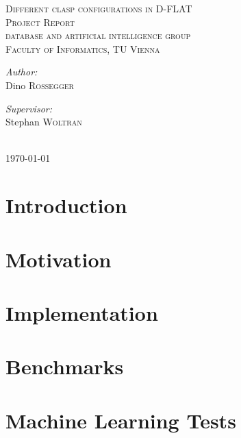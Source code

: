 

\begin{titlepage}
\center
\textsc{\LARGE{Different clasp configurations in D-FLAT}}\\[1.5cm]
\textsc{\large{Project Report}}\\[1cm]
\textsc{\large{database and artificial intelligence group}}\\
\textsc{\large{Faculty of Informatics, TU Vienna}}\\[1.5cm]
\begin{minipage}{0.4\textwidth}
	\begin{flushleft} \large
		\emph{Author:}\\
		Dino \textsc{Rossegger} %
	\end{flushleft}
\end{minipage}
\begin{minipage}{0.4\textwidth}
	\begin{flushright} \large
		\emph{Supervisor:} \\
		Stephan \textsc{Woltran} %
	\end{flushright}
\end{minipage}\\[4cm]
{\large \today}\\[2cm]
\end{titlepage}

\section{Introduction}
\section{Motivation}
\section{Implementation}
\label{sec:impl}

\section{Benchmarks}\label{sec:benchmarks}

\section{Machine Learning Tests}
\label{sec:ml}






